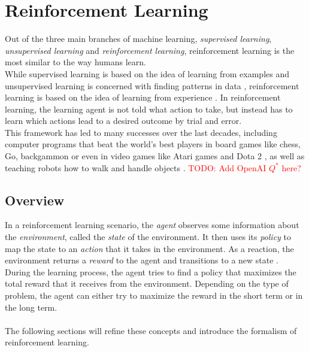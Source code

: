 \section{Reinforcement Learning}
Out of the three main branches of machine learning, \textit{supervised learning}, \textit{unsupervised learning} and \textit{reinforcement learning}, reinforcement learning is the most similar to the way humans learn.
\\
While supervised learning is based on the idea of learning from examples and unsupervised learning is concerned with finding patterns in data \cite{ibm_machine_learning}, reinforcement learning is based on the idea of learning from experience \cite[chapter 1.1]{sutton_reinforcement_nodate}.
In reinforcement learning, the learning agent is not told what action to take, but instead has to learn which actions lead to a desired outcome by trial and error.
\\
This framework has led to many successes over the last decades, including computer programs that beat the world's best players in board games like chess, Go, backgammon \cite{silver_mastering_2016,silver_mastering_2017,tesauro_temporal_1995} or even in video games like Atari games \cite{mnih_playing_2013} and Dota 2 \cite{openai_dota_2019}, as well as teaching robots how to walk and handle objects \cite{kober_reinforcement_2013,openai_learning_2019}.
\textcolor{red}{TODO: Add OpenAI $Q^*$ here?}

\subsection{Overview}
In a reinforcement learning scenario, the \textit{agent} observes some information about the \textit{environment}, called the \textit{state} of the environment.
It then uses its \textit{policy} to map the state to an \textit{action} that it takes in the environment.
As a reaction, the environment returns a \textit{reward} to the agent and transitions to a new state \cite{openai_spinning_up_rl_intro}.
\\
During the learning process, the agent tries to find a policy that maximizes the total reward that it receives from the environment.
Depending on the type of problem, the agent can either try to maximize the reward in the short term or in the long term.
\\
\\
The following sections will refine these concepts and introduce the formalism of reinforcement learning.

